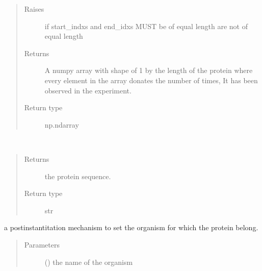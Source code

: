 \documentclass[letterpaper,10pt,english]{sphinxmanual}
\begin{document}
\begin{fulllineitems}
\begin{fulllineitems}
\begin{quote}
\begin{description}
\begin{itemize}
\end{itemize}

\item[{Raises}] \leavevmode
{} \textendash{} if start\_indxs and end\_idxs MUST be of equal length are not of equal length

\item[{Returns}] \leavevmode
A numpy array with shape of 1 by the length of the protein where every element in the array donates the number of times, It has been observed in the experiment.

\item[{Return type}] \leavevmode
np.ndarray

\end{description}\end{quote}

\end{fulllineitems}


\begin{fulllineitems}
\label{\detokenize{IPTK.Classes:IPTK.Classes.Protein.Protein.get_seq}}~\begin{quote}\begin{description}
\item[{Returns}] \leavevmode
the protein sequence.

\item[{Return type}] \leavevmode
str

\end{description}\end{quote}

\end{fulllineitems}


\begin{fulllineitems}
\label{\detokenize{IPTK.Classes:IPTK.Classes.Protein.Protein.set_org}}
a post\sphinxhyphen{}instantitation mechanism to set the organism for which the protein belong.
\begin{quote}\begin{description}
\item[{Parameters}] \leavevmode
{} () \textendash{} the name of the organism

\end{description}\end{quote}

\end{fulllineitems}


\end{fulllineitems}
\end{document}
